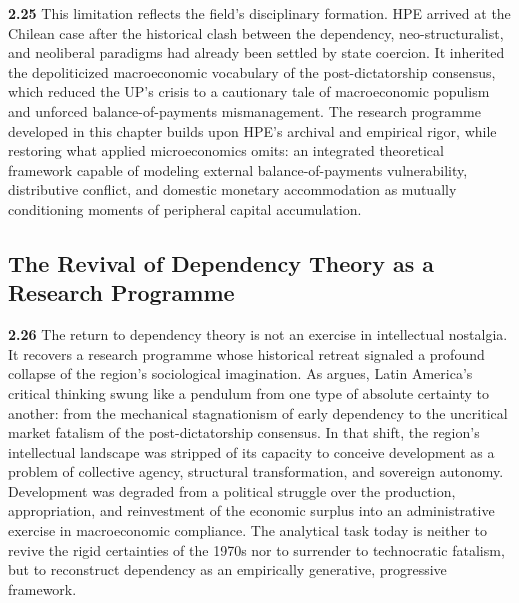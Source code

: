 \textbf{2.25} This limitation reflects the field's disciplinary formation. HPE arrived at the Chilean case after 
the historical clash between the dependency, neo-structuralist, and neoliberal paradigms had already been settled 
by state coercion. It inherited the depoliticized macroeconomic vocabulary of the 
post-dictatorship consensus, which reduced the UP's crisis to a cautionary tale of macroeconomic populism and 
unforced balance-of-payments mismanagement. The research programme developed in this chapter builds upon HPE's 
archival and empirical rigor, while restoring what applied microeconomics omits: an integrated theoretical framework  capable of modeling external balance-of-payments vulnerability, distributive conflict, and domestic monetary  accommodation as mutually conditioning moments of peripheral capital accumulation.

\subsection{The Revival of Dependency Theory as a Research Programme}
\label{sec:A5_rev_deptheory}

\textbf{2.26} The return to dependency theory is not an exercise in intellectual nostalgia. 
It recovers a research programme whose historical retreat signaled a profound collapse of the region's 
sociological imagination. As \citet{Palma2016} argues, Latin America's critical thinking swung like 
a pendulum from one type of absolute certainty to another: from the mechanical stagnationism of early 
dependency to the uncritical market fatalism of the post-dictatorship consensus. In that shift, the 
region's intellectual landscape was stripped of its capacity to conceive development as a problem of 
collective agency, structural transformation, and sovereign autonomy. Development was degraded from a 
political struggle over the production, appropriation, and reinvestment of the economic surplus into an 
administrative exercise in macroeconomic compliance. The analytical task today is neither to revive the 
rigid certainties of the 1970s nor to surrender to technocratic fatalism, but to reconstruct dependency 
as an empirically generative, progressive framework.

